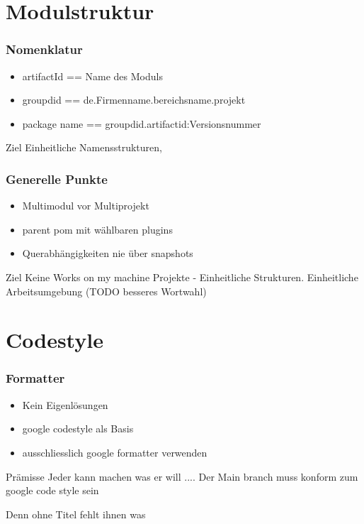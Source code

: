 \documentclass[hyperref={pdfpagelabels=false}]{beamer}
\begin{document}
\section{Modulstruktur}
\begin{frame}
  \frametitle{Nomenklatur}
  \begin{itemize}
  \item artifactId == Name des Moduls
  \item groupdid == de.Firmenname.bereichsname.projekt
    \item package name == groupdid.artifactid:Versionsnummer
  \end{itemize}
  \begin{block}{Ziel}
    Einheitliche Namensstrukturen, 
    \end{block}
\end{frame}
\begin{frame}
  \frametitle{Generelle Punkte}
  \begin{itemize}
  \item Multimodul vor Multiprojekt
  \item parent pom mit wählbaren plugins
  \item Querabhängigkeiten nie über snapshots
  \end{itemize}
  \begin{block}{Ziel}
    Keine Works on my machine Projekte - Einheitliche Strukturen. Einheitliche Arbeitsumgebung (TODO besseres Wortwahl)
    \end{block}
\end{frame}
\section{Codestyle}
\begin{frame}
  \frametitle{Formatter}
  \begin{itemize}
  \item Kein Eigenlösungen
  \item google codestyle als Basis
  \item ausschliesslich google formatter verwenden
  \end{itemize}
  \begin{block}{Prämisse}
    Jeder kann machen was er will .... Der Main branch muss konform zum google code style sein
    \end{block}
\end{frame}



\begin{frame} 
Denn ohne Titel fehlt ihnen was
\end{frame}
\end{document}
